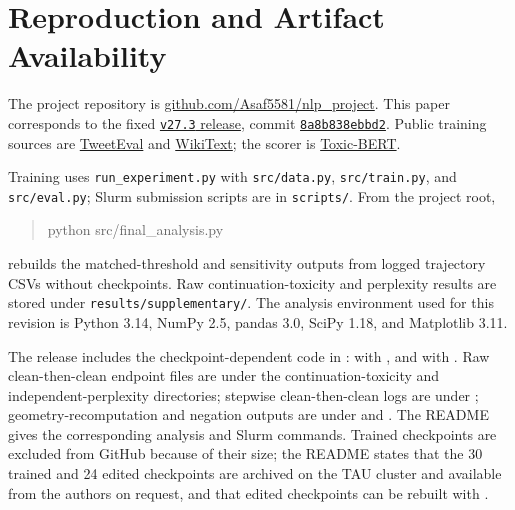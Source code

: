 \section{Reproduction and Artifact Availability}
\label{app:repro}
The project repository is \href{https://github.com/Asaf5581/nlp_project}{github.com/Asaf5581/nlp\_project}. This paper corresponds to the fixed \href{https://github.com/Asaf5581/nlp_project/tree/v27.3}{\texttt{v27.3} release}, commit \href{https://github.com/Asaf5581/nlp_project/commit/8a8b838ebbd2af81abea74f3d377bb85f81f20f8}{\texttt{8a8b838ebbd2}}. Public training sources are \href{https://huggingface.co/datasets/cardiffnlp/tweet_eval}{TweetEval} and \href{https://huggingface.co/datasets/Salesforce/wikitext}{WikiText}; the scorer is \href{https://huggingface.co/unitary/toxic-bert}{Toxic-BERT}.

Training uses \texttt{run\_experiment.py} with \texttt{src/data.py}, \texttt{src/train.py}, and \texttt{src/eval.py}; Slurm submission scripts are in \texttt{scripts/}. From the project root,
\begin{quote}\small\ttfamily
python src/final\_analysis.py
\end{quote}
rebuilds the matched-threshold and sensitivity outputs from logged trajectory CSVs without checkpoints. Raw continuation-toxicity and perplexity results are stored under \texttt{results/supplementary/}. The analysis environment used for this revision is Python 3.14, NumPy 2.5, pandas 3.0, SciPy 1.18, and Matplotlib 3.11.

The release includes the checkpoint-dependent code in :  with , and  with . Raw clean-then-clean endpoint files are under the continuation-toxicity and independent-perplexity  directories; stepwise clean-then-clean logs are under ; geometry-recomputation and negation outputs are under  and . The README gives the corresponding analysis and Slurm commands. Trained checkpoints are excluded from GitHub because of their size; the README states that the 30 trained and 24 edited checkpoints are archived on the TAU cluster and available from the authors on request, and that edited checkpoints can be rebuilt with .

